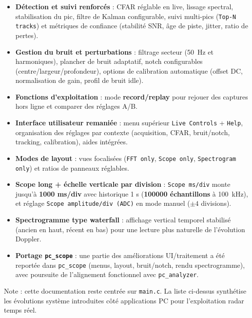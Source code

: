 \documentclass[a4paper,11pt]{article}
\begin{document}
\begin{center}
\begin{itemize}[leftmargin=2em]
  \item \textbf{D\'etection et suivi renforc\'es} :
  CFAR r\'eglable en live, lissage spectral, stabilisation du pic, filtre de Kalman configurable, suivi multi-pics (\texttt{Top-N tracks}) et m\'etriques de confiance (stabilit\'e SNR, \^age de piste, jitter, ratio de pertes).

  \item \textbf{Gestion du bruit et perturbations} :
  filtrage secteur (50~Hz et harmoniques), plancher de bruit adaptatif, notch configurables (centre/largeur/profondeur), options de calibration automatique (offset DC, normalisation de gain, profil de bruit idle).

  \item \textbf{Fonctions d'exploitation} :
  mode \textbf{record/replay} pour rejouer des captures hors ligne et comparer des r\'eglages A/B.

  \item \textbf{Interface utilisateur remani\'ee} :
  menu sup\'erieur \texttt{Live Controls} + \texttt{Help}, organisation des r\'eglages par contexte (acquisition, CFAR, bruit/notch, tracking, calibration), aides int\'egr\'ees.

  \item \textbf{Modes de layout} :
  vues focalis\'ees (\texttt{FFT only}, \texttt{Scope only}, \texttt{Spectrogram only}) et ratios de panneaux r\'eglables.

  \item \textbf{Scope long + \'echelle verticale par division} :
  \texttt{Scope ms/div} monte jusqu'\`a \textbf{1000 ms/div} avec historique 1 s (\textbf{100000 \'echantillons} \`a 100~kHz), et r\'eglage \texttt{Scope amplitude/div (ADC)} en mode manuel (\(\pm 4\) divisions).

  \item \textbf{Spectrogramme type waterfall} :
  affichage vertical temporel stabilis\'e (ancien en haut, r\'ecent en bas) pour une lecture plus naturelle de l'\'evolution Doppler.

  \item \textbf{Portage \texttt{pc\_scope}} :
  une partie des am\'eliorations UI/traitement a \'et\'e report\'ee dans \texttt{pc\_scope} (menus, layout, bruit/notch, rendu spectrogramme), avec poursuite de l'alignement fonctionnel avec \texttt{pc\_analyzer}.
\end{itemize}

Note : cette documentation reste centr\'ee sur \texttt{main.c}. La liste ci-dessus synth\'etise les \'evolutions syst\`eme introduites c\^ot\'e applications PC pour l'exploitation radar temps r\'eel.
\end{center}
\end{document}
